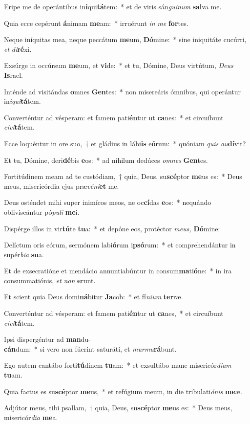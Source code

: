 \item Eripe me de operántibus in\textbf{i}qui\textbf{tá}tem:~* et de viris sán\textit{guinum} \textbf{sal}va me.
\item Quia ecce cepérunt \textbf{á}nimam \textbf{me}am:~* irruérunt \textit{in} \textit{me} \textbf{for}tes.
\item Neque iníquitas mea, neque peccátum \textbf{me}um, \textbf{Dó}mine:~* sine iniquitáte cucúrri, \textit{et} \textit{di}\textbf{ré}xi.
\item Exsúrge in occúrsum \textbf{me}um, et \textbf{vi}de:~* et tu, Dómine, Deus virtútum, \textit{Deus} \textbf{Is}rael.
\item Inténde ad visitándas \textbf{o}mnes \textbf{Gen}tes:~* non misereáris ómnibus, qui operántur in\textit{iqui}\textbf{tá}tem.
\item Converténtur ad vésperam: et famem pati\textbf{én}tur ut \textbf{ca}nes:~* et circuíbunt \textit{civi}\textbf{tá}tem.
\item Ecce loquéntur in ore suo,~† et gládius in lábi\textbf{is} e\textbf{ó}rum:~* quóniam \textit{quis} \textit{au}\textbf{dí}vit?
\item Et tu, Dómine, deri\textbf{dé}bis \textbf{e}os:~* ad níhilum dedúces \textit{omnes} \textbf{Gen}tes.
\item Fortitúdinem meam ad te custódiam,~† quia, Deus, su\textbf{scé}ptor \textbf{me}us es:~* Deus meus, misericórdia ejus præ\textit{véni}\textbf{et} me.
\item Deus osténdet mihi super inimícos meos, ne oc\textbf{cí}das \textbf{e}os:~* nequándo obliviscántur pó\textit{puli} \textbf{me}i.
\item Dispérge illos in vir\textbf{tú}te \textbf{tu}a:~* et depóne eos, protéctor \textit{meus,} \textbf{Dó}mine:
\item Delíctum oris eórum, sermónem labi\textbf{ó}rum i\textbf{psó}rum:~* et comprehendántur in supér\textit{bia} \textbf{su}a.
\item Et de exsecratióne et mendácio annuntiabúntur in consum\textbf{ma}ti\textbf{ó}ne:~* in ira consummatiónis, \textit{et} \textit{non} \textbf{e}runt.
\item Et scient quia Deus domi\textbf{ná}bitur \textbf{Ja}cob:~* et fí\textit{nium} \textbf{ter}ræ.
\item Converténtur ad vésperam: et famem pati\textbf{én}tur ut \textbf{ca}nes,~* et circuíbunt \textit{civi}\textbf{tá}tem.
\item Ipsi dispergéntur ad \textbf{man}du-\\\textbf{cán}dum:~* si vero non fúerint saturáti, et \textit{murmu}\textbf{rá}bunt.
\item Ego autem cantábo forti\textbf{tú}dinem \textbf{tu}am:~* et exsultábo mane misericór\textit{diam} \textbf{tu}am.
\item Quia factus es su\textbf{scé}ptor \textbf{me}us,~* et refúgium meum, in die tribulati\textit{ónis} \textbf{me}æ.
\item Adjútor meus, tibi psallam,~† quia, Deus, su\textbf{scé}ptor \textbf{me}us es:~* Deus meus, misericór\textit{dia} \textbf{me}a.
